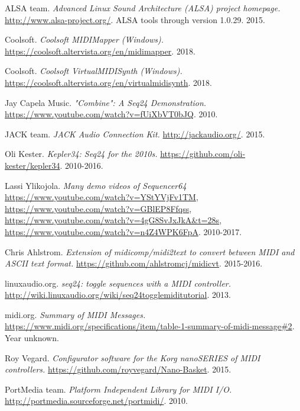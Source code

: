 \begin{thebibliography}{99}

   ALSA team.
   \emph{Advanced Linux Sound Architecture (ALSA) project homepage.}
   \url{http://www.alsa-project.org/}.
   ALSA tools through version 1.0.29.
   2015.

   Coolsoft.
   \emph{Coolsoft MIDIMapper (Windows).}
   \url{https://coolsoft.altervista.org/en/midimapper}.
   2018.

   Coolsoft.
   \emph{Coolsoft VirtualMIDISynth (Windows).}
   \url{https://coolsoft.altervista.org/en/virtualmidisynth}.
   2018.

   Jay Capela Music.
   \emph{"Combine": A Seq24 Demonstration.}
   \url{https://www.youtube.com/watch?v=fUiXbVT0bJQ}.
   2010.

   JACK team.
   \emph{JACK Audio Connection Kit.}
   \url{http://jackaudio.org/}.
   2015.

   Oli Kester.
   \emph{Kepler34: Seq24 for the 2010s.}
   \url{https://github.com/oli-kester/kepler34}.
   2010-2016.

   Lassi Ylikojola.
   \emph{Many demo videos of Sequencer64}
   \url{https://www.youtube.com/watch?v=YStYVjFv1TM},
   \url{https://www.youtube.com/watch?v=GBlEP8Ffqss},
   \url{https://www.youtube.com/watch?v=4gG8SvJxJkA&t=28s},
   \url{https://www.youtube.com/watch?v=n4Z4WPK6FpA}.
   2010-2017.

   Chris Ahlstrom.
   \emph{Extension of midicomp/midi2text to convert between MIDI and ASCII
      text format.}
   \url{https://github.com/ahlstromcj/midicvt}.
   2015-2016.

   linuxaudio.org.
   \emph{seq24: toggle sequences with a MIDI controller.}
   \url{http://wiki.linuxaudio.org/wiki/seq24togglemiditutorial}.
   2013.

   midi.org.
   \emph{Summary of MIDI Messages.}
   \url{https://www.midi.org/specifications/item/table-1-summary-of-midi-message#2}.
   Year unknown.

   Roy Vegard.
   \emph{Configurator software for the Korg nanoSERIES of MIDI controllers.}
   \url{https://github.com/royvegard/Nano-Basket}.
   2015.

   PortMedia team.
   \emph{Platform Independent Library for MIDI I/O.}
   \url{http://portmedia.sourceforge.net/portmidi/}.
   2010.


\end{thebibliography}
